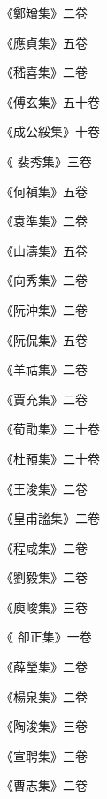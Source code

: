 \begin{pinyinscope}
 《鄭矰集》二卷



 《應貞集》五卷



 《嵇喜集》二卷



 《傅玄集》五十卷



 《成公綏集》十卷



 《
 裴秀集》三卷



 《何禎集》五卷



 《袁準集》二卷



 《山濤集》五卷



 《向秀集》二卷



 《阮沖集》二卷



 《阮侃集》五卷



 《羊祜集》二卷



 《賈充集》二卷



 《荀勖集》二十卷



 《杜預集》二十卷



 《王浚集》二卷



 《皇甫謐集》二卷



 《程咸集》二卷



 《劉毅集》二卷



 《庾峻集》三卷



 《
 卻正集》一卷



 《薛瑩集》二卷



 《楊泉集》二卷



 《陶浚集》三卷



 《宣聘集》三卷



 《曹志集》二卷




\end{pinyinscope}
